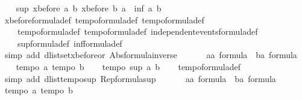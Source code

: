 \begin{isabellebody}
\ \ \isamarkupfalse%
\ {\isachardoublequoteopen}sup\ {\isacharparenleft}xbefore\ a\ b{\isacharparenright}\ {\isacharparenleft}xbefore\ b\ a{\isacharparenright}\ {\isacharequal}\ inf\ a\ b{\isachardoublequoteclose}\isanewline
\ \ \isamarkupfalse%
\ xbefore{\isacharunderscore}formula{\isacharunderscore}def\ tempo{}{\isacharunderscore}formula{\isacharunderscore}def\ tempo{}{\isacharunderscore}formula{\isacharunderscore}def\ \isanewline
\ \ \ \ tempo{}{\isacharunderscore}formula{\isacharunderscore}def\ tempo{}{\isacharunderscore}formula{\isacharunderscore}def\ independent{\isacharunderscore}events{\isacharunderscore}formula{\isacharunderscore}def\ \isanewline
\ \ \ \ sup{\isacharunderscore}formula{\isacharunderscore}def\ inf{\isacharunderscore}formula{\isacharunderscore}def\isanewline
\ \ \isamarkupfalse%
\ {\isacharparenleft}simp\ add{\isacharcolon}\ dlistset{\isacharunderscore}xbefore{\isacharunderscore}or\ Abs{\isacharunderscore}formula{\isacharunderscore}inverse{\isacharparenright}\isanewline
\ \ \isamarkupfalse%
\isanewline
\ \ \isamarkupfalse%
\ a{\isacharcolon}{\isacharcolon}{\isachardoublequoteopen}{\isacharprime}a\ formula{\isachardoublequoteclose}\ \ b{\isacharcolon}{\isacharcolon}{\isachardoublequoteopen}{\isacharprime}a\ formula{\isachardoublequoteclose}\isanewline
\ \ \isamarkupfalse%
\ {\isachardoublequoteopen}tempo{}\ a{\isachardoublequoteclose}\ {\isachardoublequoteopen}tempo{}\ b{\isachardoublequoteclose}\isanewline
\ \ \isamarkupfalse%
\ {\isachardoublequoteopen}tempo{}\ {\isacharparenleft}sup\ a\ b{\isacharparenright}{\isachardoublequoteclose}\isanewline
\ \ \isamarkupfalse%
\ tempo{}{\isacharunderscore}formula{\isacharunderscore}def\ \isanewline
\ \ \isamarkupfalse%
\ {\isacharparenleft}simp\ add{\isacharcolon}\ dlist{\isacharunderscore}tempo{}{\isacharunderscore}sup\ Rep{\isacharunderscore}formula{\isacharunderscore}sup{\isacharparenright}\isanewline
\ \ \isamarkupfalse%
\isanewline
\ \ \isamarkupfalse%
\ a{\isacharcolon}{\isacharcolon}{\isachardoublequoteopen}{\isacharprime}a\ formula{\isachardoublequoteclose}\ \ b{\isacharcolon}{\isacharcolon}{\isachardoublequoteopen}{\isacharprime}a\ formula{\isachardoublequoteclose}\isanewline
\ \ \isamarkupfalse%
\ {\isachardoublequoteopen}tempo{}\ a{\isachardoublequoteclose}\ {\isachardoublequoteopen}tempo{}\ b{\isachardoublequoteclose}\isanewline

\end{isabellebody}
